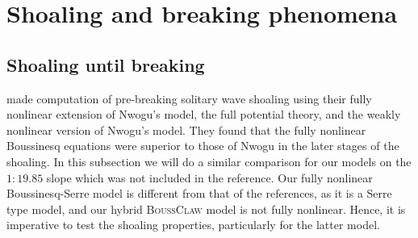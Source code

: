 \documentclass[review]{elsarticle}
\newcommand{\BoussClaw}{\textsc{BoussClaw} }
\begin{document}




\section{Shoaling and breaking phenomena}
\label{sec:shoaling_breaking}

\subsection{Shoaling until breaking}
\label{sec:num_shoaling}
\citet{wei1995fully} made computation of pre-breaking solitary wave shoaling using
 their fully nonlinear extension of Nwogu's model, the full potential 
theory, and the weakly nonlinear version of Nwogu's model.
They found that the fully nonlinear Boussinesq equations were superior to those of Nwogu in the later stages of the shoaling.
In this subsection we will do a similar comparison for our models on the $1:19.85$ slope which was not included in the reference. Our fully nonlinear Boussinesq-Serre model is different from that of the references, as it is a Serre type model, 
and our hybrid \BoussClaw model is not fully nonlinear. Hence, it is imperative
to test the shoaling properties, particularly for the latter model.   
 
\end{document}
